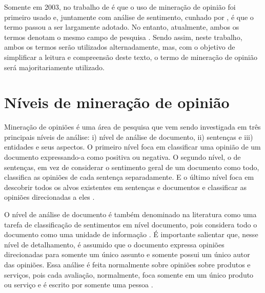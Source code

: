 \documentclass[template.tex]{subfiles}
\begin{document}
Somente em 2003, no trabalho de  é que o uso de mineração de opinião foi primeiro usado e, juntamente com análise de sentimento, cunhado por , é que o termo passou a ser largamente adotado. No entanto, atualmente, ambos os termos denotam o mesmo campo de pesquisa \cite{bing:2012, pang:2008}. Sendo assim, neste trabalho, ambos os termos serão utilizados alternadamente, mas, com o objetivo de simplificar a leitura e compreensão deste texto, o termo de mineração de opinião será majoritariamente utilizado.

\section{Níveis de mineração de opinião}


Mineração de opiniões é uma área de pesquisa que vem sendo investigada em três principais níveis de análise: i) nível de análise de documento, ii) sentenças e iii) entidades e seus aspectos. O primeiro nível foca em classificar uma opinião de um documento expressando-a como positiva ou negativa. O segundo nível, o de sentenças, em vez de considerar o sentimento geral de um documento como todo, classifica as opiniões de cada sentença separadamente. E o último nível foca em descobrir todos os alvos existentes em sentenças e documentos e classificar as opiniões direcionadas a eles \cite{bing:2012}.

O nível de análise de documento é também denominado na literatura como uma tarefa de classificação de sentimentos em nível documento, pois considera todo o documento como uma unidade de informação \cite{bing:2012, pang:2008}. É importante salientar que, nesse nível de detalhamento, é assumido que o documento expressa opiniões direcionadas para somente um único assunto e somente possui um único autor das opiniões. Essa análise é feita normalmente sobre opiniões sobre produtos e serviços, pois cada avaliação, normalmente, foca somente em um único produto ou serviço e é escrito por somente uma pessoa \cite{bing:2012}.
\end{document}
